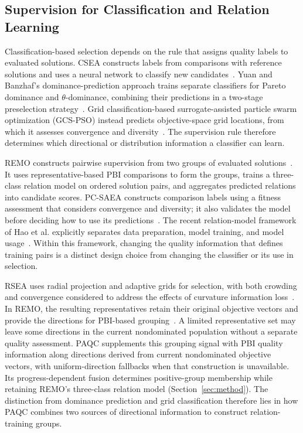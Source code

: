 \documentclass[final,5p,times,twocolumn]{elsarticle}
\begin{document}
\subsection{Supervision for Classification and Relation Learning}
\label{sec:related:relation}

Classification-based selection depends on the rule that assigns quality
labels to evaluated solutions. CSEA constructs labels from comparisons with
reference solutions and uses a neural network to classify new
candidates~\cite{ref:csea}. Yuan and Banzhaf's dominance-prediction approach
trains separate classifiers for Pareto dominance and $\theta$-dominance,
combining their predictions in a two-stage preselection
strategy~\cite{ref:theta_dea_dp}. Grid classification-based surrogate-assisted
particle swarm optimization (GCS-PSO) instead predicts objective-space grid
locations, from which it assesses convergence and
diversity~\cite{ref:gcs_pso}. The supervision rule therefore determines which
directional or distribution information a classifier can learn.

REMO constructs pairwise supervision from two groups of evaluated
solutions~\cite{ref:remo}. It uses representative-based PBI comparisons to
form the groups, trains a three-class relation model on ordered solution
pairs, and aggregates predicted relations into candidate scores. PC-SAEA
constructs comparison labels using a fitness assessment that considers
convergence and diversity; it also validates the model before deciding how
to use its predictions~\cite{ref:pcsaea}. The recent relation-model framework
of Hao et al. explicitly separates data preparation, model training, and
model usage~\cite{ref:relation_framework}. Within this framework, changing
the quality information that defines training pairs is a distinct design
choice from changing the classifier or its use in selection.

RSEA uses radial projection and adaptive grids for selection, with both
crowding and convergence considered to address the effects of curvature
information loss~\cite{ref:rsea}. In REMO, the resulting representatives
retain their original objective vectors and provide the directions for
PBI-based grouping~\cite{ref:remo}. A limited representative set may leave
some directions in the current nondominated population without a separate
quality assessment. PAQC supplements this grouping signal with PBI quality
information along directions derived from current nondominated objective
vectors, with uniform-direction fallbacks when that construction is
unavailable. Its progress-dependent fusion determines positive-group
membership while retaining REMO's three-class relation model
(Section~\ref{sec:method}). The distinction from dominance prediction and
grid classification therefore lies in how PAQC combines two sources of
directional information to construct relation-training groups.
\end{document}
